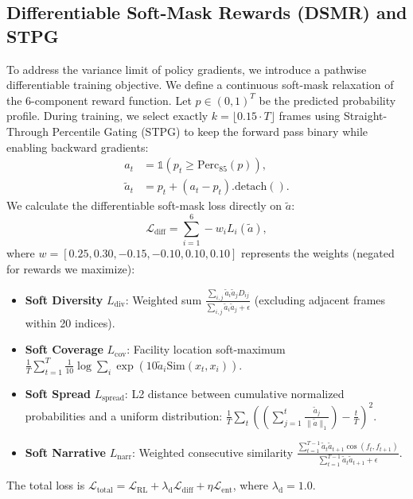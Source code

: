 \documentclass[letterpaper]{article} %
\begin{document}
\subsection{Differentiable Soft-Mask Rewards (DSMR) and STPG}
To address the variance limit of policy gradients, we introduce a pathwise differentiable training objective. We define a continuous soft-mask relaxation of the 6-component reward function.
Let $p \in (0, 1)^T$ be the predicted probability profile. During training, we select exactly $k = \lfloor 0.15 \cdot T \rfloor$ frames using Straight-Through Percentile Gating (STPG) to keep the forward pass binary while enabling backward gradients:
\begin{align}
    a_t &= \mathbb{1}(p_t \geq \text{Perc}_{85}(p)), \\
    \tilde{a}_t &= p_t + (a_t - p_t).\text{detach}().
\end{align}
We calculate the differentiable soft-mask loss directly on $\tilde{a}$:
\begin{equation}
    \mathcal{L}_{\text{diff}} = \sum_{i=1}^6 -w_i L_i(\tilde{a}),
\end{equation}
where $w = [0.25, 0.30, -0.15, -0.10, 0.10, 0.10]$ represents the weights (negated for rewards we maximize):
\begin{itemize}
    \item \textbf{Soft Diversity} $L_{\text{div}}$: Weighted sum $\frac{\sum_{i,j} \tilde{a}_i \tilde{a}_j D_{ij}}{\sum_{i,j} \tilde{a}_i \tilde{a}_j + \epsilon}$ (excluding adjacent frames within 20 indices).
    \item \textbf{Soft Coverage} $L_{\text{cov}}$: Facility location soft-maximum $\frac{1}{T}\sum_{t=1}^T \frac{1}{10} \log\sum_i \exp(10 \tilde{a}_i \text{Sim}(x_t, x_i))$.
    \item \textbf{Soft Spread} $L_{\text{spread}}$: L2 distance between cumulative normalized probabilities and a uniform distribution: $\frac{1}{T}\sum_t \left(\left(\sum_{j=1}^t \frac{\tilde{a}_j}{\|\tilde{a}\|_1}\right) - \frac{t}{T}\right)^2$.
    \item \textbf{Soft Narrative} $L_{\text{narr}}$: Weighted consecutive similarity $\frac{\sum_{t=1}^{T-1} \tilde{a}_t \tilde{a}_{t+1} \cos(f_t, f_{t+1})}{\sum_{t=1}^{T-1} \tilde{a}_t \tilde{a}_{t+1} + \epsilon}$.
\end{itemize}
The total loss is $\mathcal{L}_{\text{total}} = \mathcal{L}_{\text{RL}} + \lambda_{\text{d}} \mathcal{L}_{\text{diff}} + \eta \mathcal{L}_{\text{ent}}$, where $\lambda_{\text{d}} = 1.0$.
\end{document}
